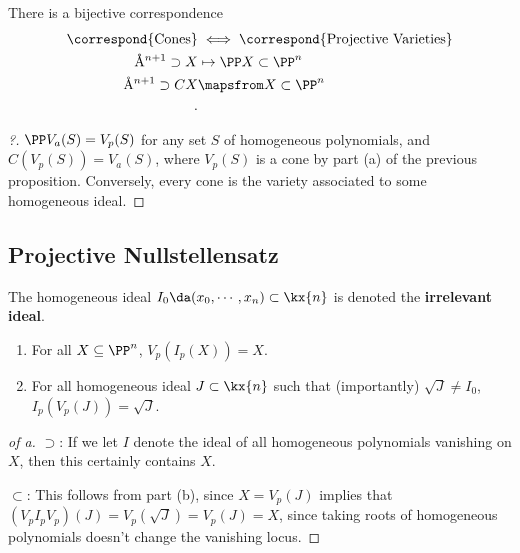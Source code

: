 \begin{lemma}[?]

There is a bijective correspondence
\begin{align*}  
\correspond{\text{Cones}} 
&\iff
\correspond{\text{Projective Varieties}} \\
\AA^{n+1} \supset X &\mapsto \PP X\subset \PP^n \\
\AA^{n+1} \supset CX &\mapsfrom X\subset \PP^n \\
.\end{align*}

\end{lemma}

\begin{proof}[?]

\(\PP V_a(S) = V_p(S)\) for any set \(S\) of homogeneous polynomials,
and \(C(V_p(S)) = V_a(S)\), where \(V_p(S)\) is a cone by part (a) of
the previous proposition. Conversely, every cone is the variety
associated to some homogeneous ideal.

\end{proof}

\hypertarget{projective-nullstellensatz}{%
\subsection{Projective
Nullstellensatz}\label{projective-nullstellensatz}}

\begin{definition}

The homogeneous ideal \(I_0 \da (x_0, \cdots, x_n) \subset \kx{n}\) is
denoted the \textbf{irrelevant ideal}.

\end{definition}

\begin{proposition}

\envlist

\begin{enumerate}
\def\labelenumi{\alph{enumi}.}
\item
  For all \(X\subseteq \PP^n\), \(V_p(I_p(X)) = X\).
\item
  For all homogeneous ideal \(J\subset \kx{n}\) such that (importantly)
  \(\sqrt{J} \neq I_0\), \(I_p(V_p(J)) = \sqrt J\).
\end{enumerate}

\end{proposition}

\begin{proof}[of a]

\(\supset\): If we let \(I\) denote the ideal of all homogeneous
polynomials vanishing on \(X\), then this certainly contains \(X\).

\(\subset\): This follows from part (b), since \(X = V_p(J)\) implies
that \((V_p I_p V_p)(J) = V_p(\sqrt J) = V_p(J) = X\), since taking
roots of homogeneous polynomials doesn't change the vanishing locus.

\end{proof}

